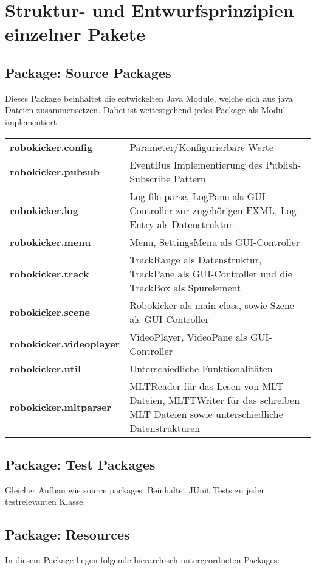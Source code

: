 \chapter{Struktur- und Entwurfsprinzipien einzelner Pakete}

\section{Package: Source Packages}
Dieses Package beinhaltet die entwickelten Java Module, welche sich aus java Dateien zusammensetzen. Dabei ist weitestgehend jedes Package als Modul implementiert.

\begin{tabularx}{\textwidth}{lX}
\textbf{robokicker.config}&Parameter/Konfigurierbare Werte\\
\textbf{robokicker.pubsub}&EventBus Implementierung des Publish-Subscribe Pattern\\
\textbf{robokicker.log}&Log file parse, LogPane als GUI-Controller zur zugehörigen FXML, Log Entry als Datenstruktur\\
\textbf{robokicker.menu}&Menu, SettingsMenu als GUI-Controller\\
\textbf{robokicker.track}&TrackRange als Datenstruktur, TrackPane als GUI-Controller und die TrackBox als Spurelement\\
\textbf{robokicker.scene}&Robokicker als main class, sowie Szene als GUI-Controller\\
\textbf{robokicker.videoplayer}&VideoPlayer, VideoPane als GUI-Controller\\
\textbf{robokicker.util}&Unterschiedliche Funktionalitäten\\
\textbf{robokicker.mltparser}&MLTReader für das Lesen von MLT Dateien, MLTTWriter für das schreiben MLT Dateien sowie unterschiedliche Datenstrukturen\\
\end{tabularx}

\section{Package: Test Packages}
Gleicher Aufbau wie source packages. Beinhaltet JUnit Tests zu jeder testrelevanten Klasse.

\section{Package: Resources}
In diesem Package liegen folgende hierarchisch untergeordneten Packages:

